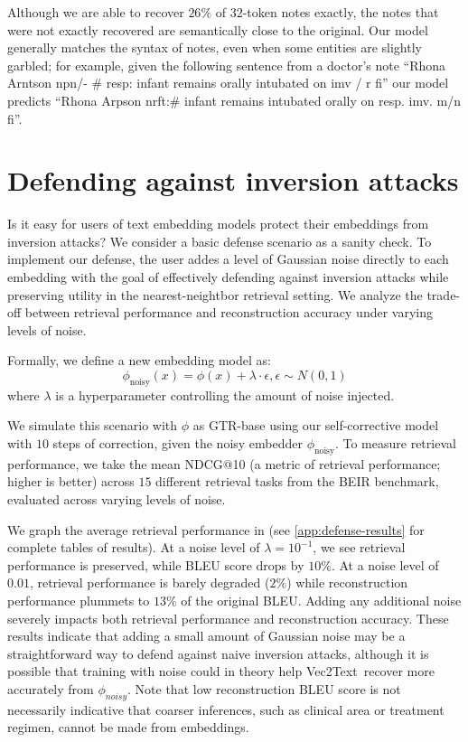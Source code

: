\documentclass[11pt]{article}
\newcommand{\MethodName}{Vec2Text}
\begin{document}
Although we are able to recover $26\%$ of $32$-token notes exactly, the notes that were not exactly recovered are semantically close to the original. Our model generally matches the syntax of notes, even when some entities are slightly garbled; for example, given the following sentence from a doctor's note ``Rhona Arntson npn/- \# resp: infant remains orally intubated on imv / r fi'' our model predicts ``Rhona Arpson nrft:\# infant remains intubated orally on resp. imv. m/n fi''.




\section{Defending against inversion attacks}
Is it easy for users of text embedding models protect their embeddings from inversion attacks? We consider a basic defense scenario as a sanity check. To implement our defense,  the user addes a level of Gaussian noise directly to each embedding with the goal of effectively defending against inversion attacks while preserving utility in the nearest-neightbor retrieval setting. We analyze the trade-off between retrieval performance and reconstruction accuracy under varying levels of noise.

Formally, we define a new embedding model as:
\[
\phi_{\text{noisy}}(x) = \phi(x) + \lambda \cdot \epsilon, \epsilon \sim N(0, 1)
\]
\noindent where $\lambda$ is a hyperparameter controlling the amount of noise injected.

We simulate this scenario with $\phi$ as GTR-base using our self-corrective model with $10$ steps of correction, given the noisy embedder $\phi_{\text{noisy}}$. To measure retrieval performance, we take the mean NDCG@10 (a metric of retrieval performance; higher is better) across $15$ different retrieval tasks from the BEIR benchmark, evaluated across varying levels of noise.

We graph the average retrieval performance in  (see \ref{app:defense-results} for complete tables of results).
At a noise level of $\lambda = 10^{-1}$, we see retrieval performance is preserved, while BLEU score drops by $10\%$. At a noise level of $0.01$, retrieval performance is barely degraded ($2\%$) while reconstruction performance plummets to $13\%$ of the original BLEU. Adding any additional noise severely impacts both retrieval performance and reconstruction accuracy. These results indicate that adding a small amount of Gaussian noise may be a straightforward way to defend against naive inversion attacks, although it is possible that training with noise could in theory help \MethodName\ recover more accurately from $\phi_{noisy}$. Note that low reconstruction BLEU score is not necessarily indicative that coarser inferences, such as clinical area or treatment regimen, cannot be made from embeddings.
\end{document}
